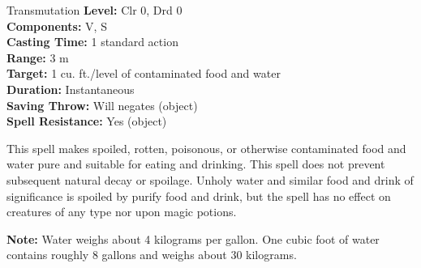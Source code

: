 {Transmutation}
{
	\textbf{Level:}
	Clr 0, Drd 0\\
	\textbf{Components:}
	V, S\\
	\textbf{Casting Time:}
	1 standard action\\
	\textbf{Range:}
	3 m\\
	\textbf{Target:}
	1 cu. ft./level of contaminated food and water\\
	\textbf{Duration:}
	Instantaneous\\
	\textbf{Saving Throw:}
	Will negates (object)\\
	\textbf{Spell Resistance:}
	Yes (object)\\
}
{
	This spell makes spoiled, rotten, poisonous, or otherwise contaminated food and water pure and suitable for eating and drinking. This spell does not prevent subsequent natural decay or spoilage. Unholy water and similar food and drink of significance is spoiled by purify food and drink, but the spell has no effect on creatures of any type nor upon magic potions.

	\textbf{Note:} Water weighs about 4 kilograms per gallon. One cubic foot of water contains roughly 8 gallons and weighs about 30 kilograms.

}
